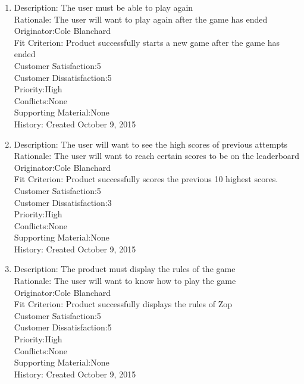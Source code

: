 \documentclass[12pt]{article}
\begin{document}
\begin{enumerate}
 \item Description: The user must be able to play again\\
 Rationale: The user will want to play again after the game has ended\\
 Originator:Cole Blanchard\\
 Fit Criterion: Product successfully starts a new game after the game has ended\\
 Customer Satisfaction:5\\
 Customer Dissatisfaction:5\\
 Priority:High\\
 Conflicts:None\\
 Supporting Material:None\\
 History: Created October 9, 2015\\
 
 \item Description: The user will want to see the high scores of previous attempts\\
 Rationale: The user will want to reach certain scores to be on the leaderboard\\
 Originator:Cole Blanchard\\
 Fit Criterion: Product successfully scores the previous 10 highest scores.\\
 Customer Satisfaction:5\\
 Customer Dissatisfaction:3\\
 Priority:High\\
 Conflicts:None\\
 Supporting Material:None\\
 History: Created October 9, 2015\\
 
 \item Description: The product must display the rules of the game\\
 Rationale: The user will want to know how to play the game\\
 Originator:Cole Blanchard\\
 Fit Criterion: Product successfully displays the rules of Zop\\
 Customer Satisfaction:5\\
 Customer Dissatisfaction:5\\
 Priority:High\\
 Conflicts:None\\
 Supporting Material:None\\
 History: Created October 9, 2015\\
 

\end{enumerate}
\end{document}
